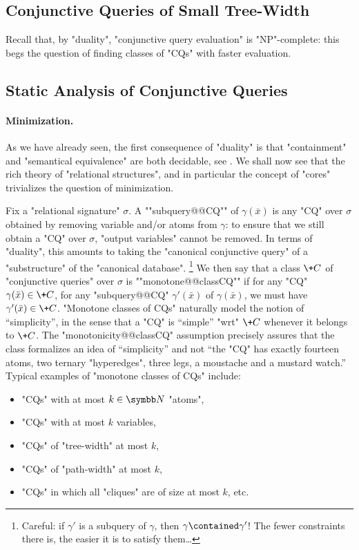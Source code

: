 \subsection{Conjunctive Queries of Small Tree-Width}

Recall that, by "duality", "conjunctive query evaluation" is "NP"-complete:
this begs the question of finding classes of "CQs" with faster evaluation.
\todo{}

\subsection{Static Analysis of Conjunctive Queries}
\label{sec:prelim-db-static-analysis-cq}

\paragraph*{Minimization.}
As we have already seen, the first consequence of "duality" is that
"containment" and "semantical equivalence" are both
decidable, see .
We shall now see that the rich theory of "relational structures",
and in particular the concept of "cores" trivializes the question of minimization.

Fix a "relational signature" $\sigma$.
A ""subquery@@CQ"" of $\gamma(\bar x)$ is any "CQ" over $\sigma$
obtained by removing variable and/or atoms from $\gamma$:
to ensure that we still obtain a "CQ" over $\sigma$, "output variables" 
cannot be removed.
In terms of "duality", this amounts to taking the "canonical conjunctive query" of
a "substructure" of the "canonical database".%
\footnote{Careful: if $\gamma'$ is a subquery of $\gamma$, then $\gamma \contained \gamma'$!
The fewer constraints there is, the easier it is to satisfy them…}
We then say that a class $\+C$ of "conjunctive queries" over $\sigma$ is ""monotone@@classCQ""
if for any "CQ" $\gamma(\bar x) \in \+C$, for any "subquery@@CQ" $\gamma'(\bar x)$ of
$\gamma(\bar x)$, we must have $\gamma'(\bar x) \in \+C$.
"Monotone classes of CQs" naturally model the notion of ``simplicity'', in the sense that
a "CQ" is ``simple'' "wrt" $\+C$ whenever it belongs to $\+C$. The "monotonicity@@classCQ"
assumption precisely assures that the class formalizes an idea of ``simplicity''
and not ``the "CQ" has exactly fourteen atoms, two ternary "hyperedges", three legs,
a moustache and a mustard watch.''
Typical examples of "monotone classes of CQs" include:
\begin{itemize}
	\item "CQs" with at most $k \in \N$ "atoms",
	\item "CQs" with at most $k$ variables,
	\item "CQs" of "tree-width" at most $k$,
	\item "CQs" of "path-width" at most $k$,
	\item "CQs" in which all "cliques" are of size at most $k$, etc.
\end{itemize}

